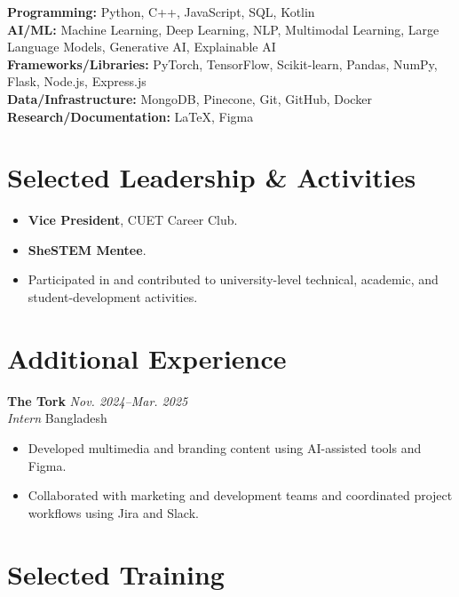 \documentclass[a4paper,11pt]{article}
\newcommand{\entry}[4]{
  \textbf{#1} \hfill \textit{#4}\\
  \textit{#2} \hfill #3\\[-0.25em]
}
\begin{document}
\textbf{Programming:} Python, C++, JavaScript, SQL, Kotlin\\
\textbf{AI/ML:} Machine Learning, Deep Learning, NLP, Multimodal Learning,
Large Language Models, Generative AI, Explainable AI\\
\textbf{Frameworks/Libraries:} PyTorch, TensorFlow, Scikit-learn, Pandas,
NumPy, Flask, Node.js, Express.js\\
\textbf{Data/Infrastructure:} MongoDB, Pinecone, Git, GitHub, Docker\\
\textbf{Research/Documentation:} LaTeX, Figma

\section*{Selected Leadership \& Activities}

\begin{itemize}
    \item \textbf{Vice President}, CUET Career Club.
    \item \textbf{SheSTEM Mentee}.
    \item Participated in and contributed to university-level technical,
    academic, and student-development activities.
\end{itemize}

\section*{Additional Experience}

\entry
{The Tork}
{Intern}
{Bangladesh}
{Nov. 2024--Mar. 2025}

\begin{itemize}
    \item Developed multimedia and branding content using AI-assisted tools
    and Figma.
    \item Collaborated with marketing and development teams and coordinated
    project workflows using Jira and Slack.
\end{itemize}

\section*{Selected Training}
\end{document}
